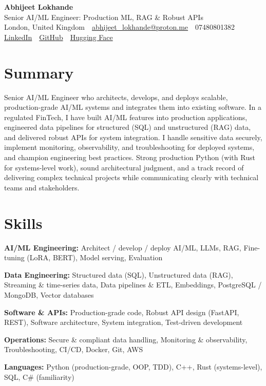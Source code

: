 \documentclass[10pt,a4paper]{article}
\newcommand{\sep}{\,\textcolor{accent!60}{\textbar}\,}
\begin{document}
\begin{center}
  {\fontsize{24}{26}\selectfont\bfseries Abhijeet Lokhande}\\[3pt]
  {\color{accent}\large Senior AI/ML Engineer: Production ML, RAG \& Robust APIs}\\[5pt]
  {\small
    London, United Kingdom \sep
    \href{mailto:abhijeet_lokhande@proton.me}{abhijeet\_lokhande@proton.me} \sep
    07480801382 \\[2pt]
    \href{https://www.linkedin.com/in/ablds/}{LinkedIn} \sep
    \href{https://github.com/abhijeetscode}{GitHub} \sep
    \href{https://huggingface.co/ab-ai}{Hugging Face}
  }
\end{center}
\vspace{2pt}

\section{Summary}
Senior AI/ML Engineer who architects, develops, and deploys scalable, production-grade AI/ML systems and integrates them into existing software. In a regulated FinTech, I have built AI/ML features into production applications, engineered data pipelines for structured (SQL) and unstructured (RAG) data, and delivered robust APIs for system integration. I handle sensitive data securely, implement monitoring, observability, and troubleshooting for deployed systems, and champion engineering best practices. Strong production Python (with Rust for systems-level work), sound architectural judgment, and a track record of delivering complex technical projects while communicating clearly with technical teams and stakeholders.

\section{Skills}
\begin{tight}
  \item[\textcolor{accent}{\small$\bullet$}] \textbf{AI/ML Engineering:} Architect / develop / deploy AI/ML, LLMs, RAG, Fine-tuning (LoRA, BERT), Model serving, Evaluation
  \item[\textcolor{accent}{\small$\bullet$}] \textbf{Data Engineering:} Structured data (SQL), Unstructured data (RAG), Streaming \& time-series data, Data pipelines \& ETL, Embeddings, PostgreSQL / MongoDB, Vector databases
  \item[\textcolor{accent}{\small$\bullet$}] \textbf{Software \& APIs:} Production-grade code, Robust API design (FastAPI, REST), Software architecture, System integration, Test-driven development
  \item[\textcolor{accent}{\small$\bullet$}] \textbf{Operations:} Secure \& compliant data handling, Monitoring \& observability, Troubleshooting, CI/CD, Docker, Git, AWS
  \item[\textcolor{accent}{\small$\bullet$}] \textbf{Languages:} Python (production-grade, OOP, TDD), C++, Rust (systems-level), SQL, C\# (familiarity)
\end{tight}
\end{document}
